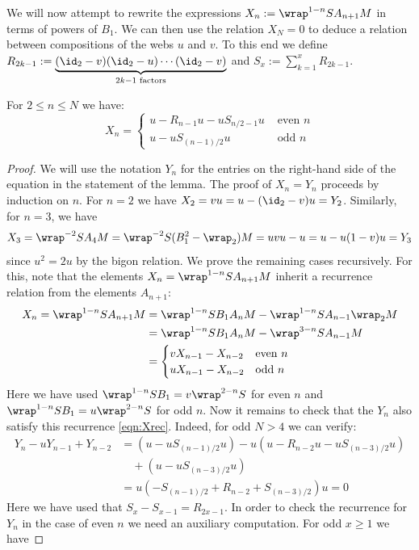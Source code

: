 We will now attempt to rewrite the expressions $X_n:=\wrap^{1-n} S A_{n+1} M$ in terms of powers of $B_1$. We can then use the relation $X_N=0$ to deduce a relation between compositions of the webs $u$ and $v$. 
To this end we define $R_{2k-1}:=\underbrace{(\id_2-v)(\id_2-u)\cdots (\id_2-v)}_{2k-1 \text{ factors}}$ and $S_x:=\sum_{k=1}^x R_{2k-1}$. 

\begin{lemma} \label{lem:XY}For $2\leq n \leq N$ we have:
\[X_n = \begin{cases} 
u - R_{n-1}u - u S_{n/2-1} u & \text{ even } n \\
u - u S_{(n-1)/2} u & \text{ odd } n
\end{cases}\]
\end{lemma}
\begin{proof} We will use the notation $Y_n$ for the entries on the right-hand side of the equation in the statement of the lemma. The proof of $X_n=Y_n$ proceeds by induction on $n$. For $n=2$ we have $X_2=v u = u-(\id_2-v)u = Y_2$. Similarly, for $n=3$, we have
\[ X_3=\wrap^{-2} S A_{4} M = \wrap^{-2} S (B_1^2-\wrap_2) M = uvu-u = u - u(1-v)u = Y_3\] since $u^2=2 u$ by the bigon relation. We prove the remaining cases recursively. For this, note that the elements $X_n=\wrap^{1-n} S A_{n+1} M$ inherit a recurrence relation from the elements $A_{n+1}$:
\begin{align}\label{eqn:Xrec}
X_n=\wrap^{1-n} S A_{n+1} M &= \wrap^{1-n} S B_1 A_{n} M - \wrap^{1-n} S A_{n-1} \wrap_2 M \\
\nonumber
&= \wrap^{1-n} S B_1 A_{n} M - \wrap^{3-n} S A_{n-1} M  \\
\nonumber
&= \begin{cases}
v X_{n-1} - X_{n-2} & \text{even } n\\
u X_{n-1} - X_{n-2} & \text{odd } n
\end{cases} 
\end{align}
Here we have used $\wrap^{1-n}SB_1=v \wrap^{2-n}S$ for even $n$ and $\wrap^{1-n}SB_1=u \wrap^{2-n} S$ for odd $n$. Now it remains to check that the $Y_n$ also satisfy this recurrence \eqref{eqn:Xrec}. Indeed, for odd $N>4$ we can verify:
\begin{align*}
  Y_n-uY_{n-1}+Y_{n-2} &= (u - u S_{(n-1)/2} u) - u(u - R_{n-2}u - u S_{(n-3)/2} u) \\
  &\quad + (u - u S_{(n-3)/2} u)\\
&=  u (-S_{(n-1)/2} + R_{n-2} + S_{(n-3)/2}) u =0
\end{align*}
Here we have used that $S_x-S_{x-1}= R_{2x-1}$. In order to check the recurrence for $Y_n$ in the case of even $n$ we need an auxiliary computation. For odd $x\geq 1$ we have

\end{proof}
